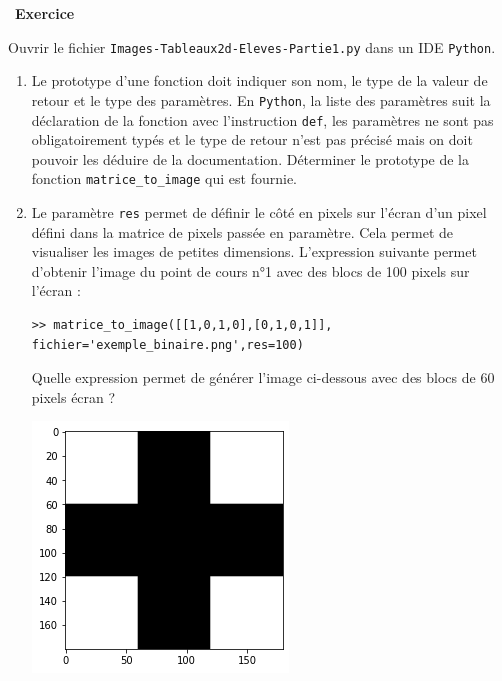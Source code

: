 \documentclass[a4paper, french, 12pt]{article}
\newcounter{exo}
\newenvironment{exercice}[1]
{\par \medskip   \addtocounter{exo}{1} \noindent  
\begin{bclogo}[arrondi =0.1,   noborder = true, logo=\bccrayon, marge=4]{~\textbf{Exercice} \textbf{\theexo} {\itshape #1} }  \par}
{
\end{bclogo}
 \par \bigskip }
\newcounter{def}
\newcounter{cours}
\begin{document}
\begin{exercice}{}

Ouvrir le fichier \texttt{Images-Tableaux2d-Eleves-Partie1.py} dans un IDE \texttt{Python}.

\begin{enumerate}
	\item Le prototype d'une fonction doit indiquer son nom, le type de la valeur de retour et le type des paramètres. En \texttt{Python},  la liste des  paramètres suit la déclaration de la fonction avec l'instruction \texttt{def}, les paramètres ne sont pas obligatoirement typés et le type de retour n'est pas précisé mais on doit pouvoir les déduire de la documentation.  
Déterminer le prototype  de la fonction  \texttt{matrice\_to\_image} qui est fournie.
\item Le paramètre \texttt{res} permet de définir le côté en pixels  sur l'écran d'un pixel défini dans la matrice de pixels passée en paramètre. Cela permet de visualiser les images de petites dimensions. L'expression suivante permet d'obtenir l'image du point de cours n°1 avec des blocs de 100 pixels sur l'écran :

\begin{lstlisting}[style=compil]
>> matrice_to_image([[1,0,1,0],[0,1,0,1]], fichier='exemple_binaire.png',res=100)
\end{lstlisting}

Quelle expression permet de générer l'image ci-dessous avec des blocs de 60 pixels écran ?

\begin{center}
\includegraphics[scale=0.4]{images/croix_binaire.png}
\end{center}
\end{enumerate}


\end{exercice}

\vspace*{-20pt}
\end{document}
